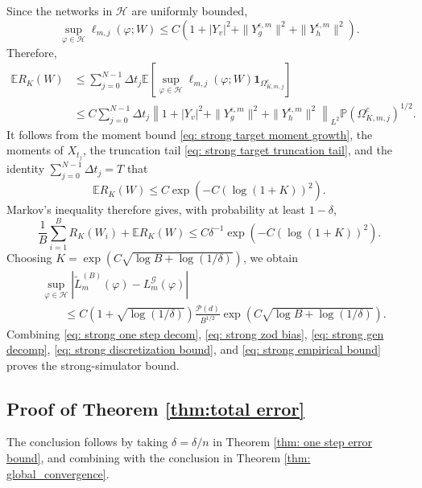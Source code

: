 \documentclass[twoside,11pt]{article}
\newcommand{\E}{\mathbb{E}}
\newcommand{\1}{\mathbf{1}}
\numberwithin{equation}{section}
\begin{document}
Since the networks in
$\mathcal H$ are uniformly bounded,
\[
    \sup_{\varphi\in\mathcal H}\ell_{m,j}(\varphi;W)
    \le
    C\left(
    1+|Y_v|^2+\|Y_g^{\epsilon,m}\|^2+\|Y_h^{\epsilon,m}\|^2
    \right).
\]
Therefore,
\[
\begin{aligned}
    \E R_K(W)
    &\le
    \sum_{j=0}^{N-1}\Delta t_j
    \E\left[
    \sup_{\varphi\in\mathcal H}\ell_{m,j}(\varphi;W)
    \1_{\Omega_{K,m,j}^c}
    \right]                                                  \\
    &\le
    C\sum_{j=0}^{N-1}\Delta t_j
    \left\|
    1+|Y_v|^2+\|Y_g^{\epsilon,m}\|^2+\|Y_h^{\epsilon,m}\|^2
    \right\|_{L^2}
    \mathbb P(\Omega_{K,m,j}^c)^{1/2}.
\end{aligned}
\]
It follows from the moment bound \eqref{eq: strong target moment growth}, the moments of
$X_{t_j}$, the truncation tail
\eqref{eq: strong target truncation tail}, and the identity
$\sum_{j=0}^{N-1}\Delta t_j=T$ that
\[
    \E R_K(W)
    \le
    C\exp\!\left(-C(\log(1+K))^2\right).
\]
 Markov's
inequality therefore gives,
with probability at least $1-\delta$,
\[
    \frac1B\sum_{i=1}^B R_K(W_i)+\E R_K(W)
    \le
    C\delta^{-1}
    \exp\!\left(-C(\log(1+K))^2\right).
\]
Choosing $ K=\exp\!\left(C\sqrt{\log B+\log(1/\delta)}\right)$,
we obtain
\begin{equation}\label{eq: strong empirical bound}
\begin{aligned}
    &\sup_{\varphi\in\mathcal H}
    \left|\tilde L_m^{(B)}(\varphi)-L_m^{\mathscr G}(\varphi)\right|  \\
    &\qquad\le
    C\left(1+\sqrt{\log(1/\delta)}\right)
    \frac{\mathcal P(d)}{B^{1/2}}
    \exp\!\left(C\sqrt{\log B+\log(1/\delta)}\right).
\end{aligned}
\end{equation}
Combining \eqref{eq: strong one step decom}, \eqref{eq: strong zod bias}, \eqref{eq: strong gen decomp}, \eqref{eq: strong discretization bound}, and \eqref{eq: strong empirical bound} proves the strong-simulator bound.


\subsection{Proof of Theorem \ref{thm:total error}}
The conclusion follows by taking $\delta = \delta/n$ in Theorem \ref{thm: one step error bound}, and combining with the conclusion in Theorem \ref{thm: global_convergence}.




\vskip 0.2in

\end{document}
